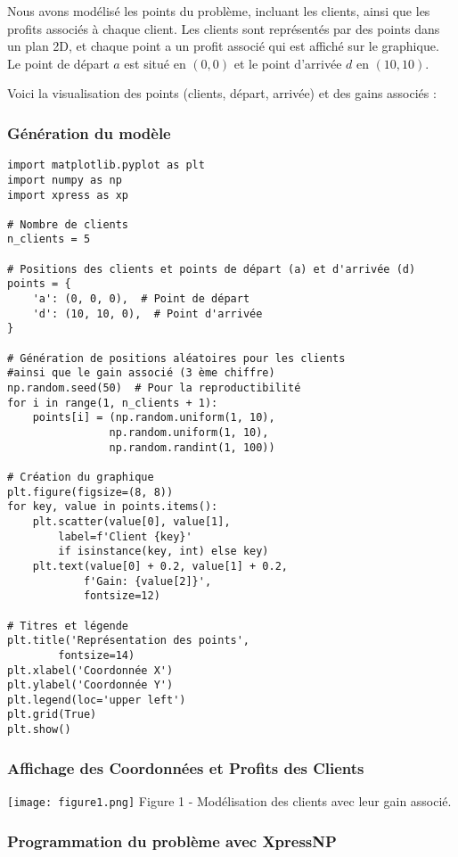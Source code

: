 \documentclass[a4paper, 12pt, DIV=12]{scrartcl}
\begin{document}
Nous avons modélisé les points du problème, incluant les clients, ainsi que les profits associés à chaque client. Les clients sont représentés par des points dans un plan 2D, et chaque point a un profit associé qui est affiché sur le graphique. Le point de départ \( a \) est situé en \( (0, 0) \) et le point d'arrivée \( d \) en \( (10, 10) \).

Voici la visualisation des points (clients, départ, arrivée) et des gains associés :
\subsubsection{Génération du modèle}
\begin{verbatim}
import matplotlib.pyplot as plt
import numpy as np
import xpress as xp

# Nombre de clients
n_clients = 5

# Positions des clients et points de départ (a) et d'arrivée (d)
points = {
    'a': (0, 0, 0),  # Point de départ
    'd': (10, 10, 0),  # Point d'arrivée
}

# Génération de positions aléatoires pour les clients
#ainsi que le gain associé (3 ème chiffre)
np.random.seed(50)  # Pour la reproductibilité
for i in range(1, n_clients + 1):
    points[i] = (np.random.uniform(1, 10), 
                np.random.uniform(1, 10), 
                np.random.randint(1, 100))

# Création du graphique
plt.figure(figsize=(8, 8))
for key, value in points.items():
    plt.scatter(value[0], value[1], 
        label=f'Client {key}' 
        if isinstance(key, int) else key)
    plt.text(value[0] + 0.2, value[1] + 0.2, 
            f'Gain: {value[2]}', 
            fontsize=12)

# Titres et légende
plt.title('Représentation des points', 
        fontsize=14)
plt.xlabel('Coordonnée X')
plt.ylabel('Coordonnée Y')
plt.legend(loc='upper left')
plt.grid(True)
plt.show()
\end{verbatim} 
\subsubsection{Affichage des Coordonnées et Profits des Clients}
\begin{center}
\texttt{[image: figure1.png]}
Figure 1 - Modélisation des clients avec leur gain associé.
\end{center}
\newpage
\subsubsection{Programmation du problème avec XpressNP}
\end{document}
